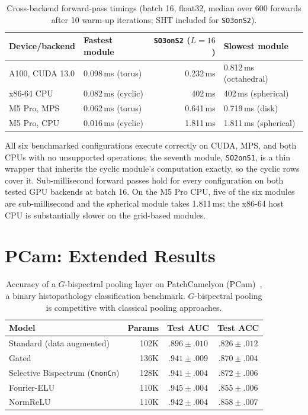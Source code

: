\documentclass{article}
\theoremstyle{definition}
\theoremstyle{remark}
\theoremstyle{definition}
\begin{document}
\begin{table}[h]
  \caption{Cross-backend forward-pass timings (batch 16, float32,
    median over 600 forwards after 10 warm-up iterations; SHT included
    for \texttt{SO3onS2}).}
  \label{tab:backend-portability}
  \centering
  \small
  \begin{tabular}{llrl}
    \toprule
    Device/backend & Fastest module & \texttt{SO3onS2} ($L{=}16$)
      & Slowest module \\
    \midrule
    A100, CUDA 13.0 & 0.098\,ms (torus)  & 0.232\,ms
      & 0.812\,ms (octahedral) \\
    x86-64 CPU      & 0.082\,ms (cyclic) & 402\,ms
      & 402\,ms (spherical) \\
    M5 Pro, MPS     & 0.062\,ms (torus)  & 0.641\,ms
      & 0.719\,ms (disk) \\
    M5 Pro, CPU     & 0.016\,ms (cyclic) & 1.811\,ms
      & 1.811\,ms (spherical) \\
    \bottomrule
  \end{tabular}
\end{table}

All six benchmarked configurations execute correctly on CUDA, MPS, and
both CPUs with no unsupported operations; the seventh module,
\texttt{SO2onS1}, is a thin wrapper that inherits the cyclic module's
computation exactly, so the cyclic rows cover it. Sub-millisecond
forward passes hold for every configuration on both tested GPU
backends at batch 16. On the M5 Pro CPU, five of the six modules are
sub-millisecond and the spherical module takes 1.811\,ms; the x86-64
host CPU is substantially slower on the grid-based modules.

\section{PCam: Extended Results}
\label{app:pcam-details}

\begin{table}[h]
  \caption{Accuracy of a $G$-bispectral pooling layer on PatchCamelyon (PCam)~\citep{veeling2018rotation}, a binary histopathology classification benchmark. $G$-bispectral pooling is competitive with classical pooling approaches.}
  \label{tab:pcam-results}
  \centering
  \small
  \begin{tabular}{lrcc}
    \toprule
    Model & Params & Test AUC & Test ACC \\
    \midrule
    Standard (data augmented)          & 102K & $.896 \pm .010$ & $.826 \pm .012$ \\
    Gated                         & 136K & $.941 \pm .009$ & $.870 \pm .004$ \\
    Selective Bispectrum (\texttt{CnonCn})  & 128K & $.941 \pm .004$ & $\mathbf{.872 \pm .006}$ \\
    Fourier-ELU                   & 110K & $\mathbf{.945 \pm .004}$ & $.855 \pm .006$ \\
    NormReLU                      & 110K & $.942 \pm .004$ & $.858 \pm .007$ \\
    \bottomrule
  \end{tabular}
\end{table}
\end{document}
